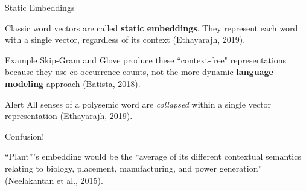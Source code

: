 \begin{frame}{Static Embeddings}



\begin{itemizeSpaced}{5pt}
    \pinkbox Classic word vectors are called \textbf{static embeddings}. They represent each word with a single vector, regardless of its context (Ethayarajh, 2019). 
    
    
    
    \begin{exampleBlock}{Example}
        \footnotesize
        Skip-Gram and Glove produce these ``context-free" representations because they use co-occurrence counts, not the more dynamic \textbf{language modeling} approach (Batista, 2018). 
    \end{exampleBlock}
    
    \begin{alertBlock}{Alert}
        \footnotesize 
        All senses of a polysemic word are \emph{\alert{collapsed}} within a single vector representation (Ethayarajh, 2019).  
        
        Confusion!  
        
        ``Plant”'s embedding would be the ``average of its different contextual semantics relating to biology, placement, manufacturing, and power generation” (Neelakantan et al., 2015).

    
    \end{alertBlock}
      
\end{itemizeSpaced}
    
\end{frame}




